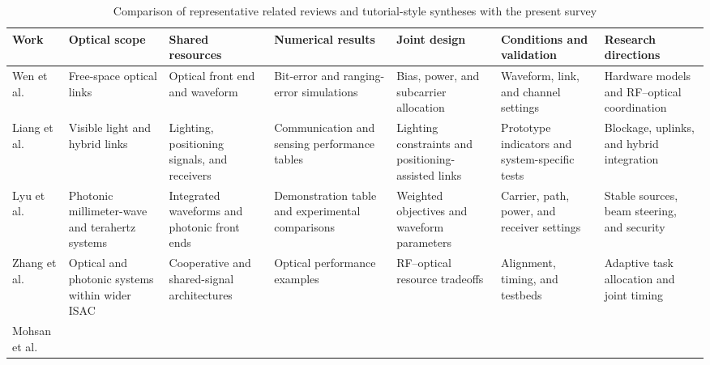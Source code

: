 \begin{table}[!t]
\caption{Comparison of representative related reviews and tutorial-style
syntheses with the present survey}
\label{tab:prior_surveys}
\centering
\begingroup
\footnotesize
\setlength{\tabcolsep}{3pt}
\renewcommand{\arraystretch}{1.16}
\begin{tabularx}{\textwidth}{@{}%
>{\raggedright\arraybackslash}p{}
>{\raggedright\arraybackslash}X
>{\raggedright\arraybackslash}X
>{\raggedright\arraybackslash}X
>{\raggedright\arraybackslash}X
>{\raggedright\arraybackslash}X
>{\raggedright\arraybackslash}X@{}}
\toprule
\textbf{Work} &
\textbf{Optical scope} &
\textbf{Shared resources} &
\textbf{Numerical results} &
\textbf{Joint design} &
\textbf{Conditions and validation} &
\textbf{Research directions} \\
\midrule
Wen et al.\ \cite{Wen2024OISACArchitectures}\newline 2024 &
Free-space optical links &
Optical front end and waveform &
Bit-error and ranging-error simulations &
Bias, power, and subcarrier allocation &
Waveform, link, and channel settings &
Hardware models and RF--optical coordination \\
\addlinespace[3pt]
Liang et al.\ \cite{Liang2024LiSACReview}\newline 2024 &
Visible light and hybrid links &
Lighting, positioning signals, and receivers &
Communication and sensing performance tables &
Lighting constraints and positioning-assisted links &
Prototype indicators and system-specific tests &
Blockage, uplinks, and hybrid integration \\
\addlinespace[3pt]
Lyu et al.\ \cite{Lyu2026PhotonicTHzWaveforms}\newline 2026 &
Photonic millimeter-wave and terahertz systems &
Integrated waveforms and photonic front ends &
Demonstration table and experimental comparisons &
Weighted objectives and waveform parameters &
Carrier, path, power, and receiver settings &
Stable sources, beam steering, and security \\
\addlinespace[3pt]
Zhang et al.\ \cite{Zhang2026ISACEvolution}\newline 2026 &
Optical and photonic systems within wider ISAC &
Cooperative and shared-signal architectures &
Optical performance examples &
RF--optical resource tradeoffs &
Alignment, timing, and testbeds &
Adaptive task allocation and joint timing \\
\addlinespace[3pt]
Mohsan et al.\ \cite{Mohsan2026OISACReview}\newline 2026 &

\end{tabularx}
\end{table}
